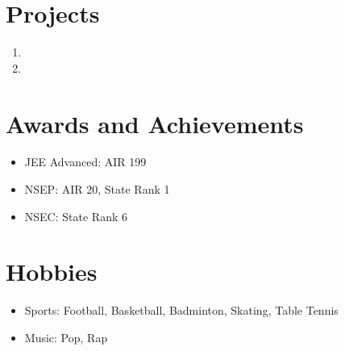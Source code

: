 \documentclass{article}
\begin{document}
\section*{\fontsize{11}{15}\selectfont Projects}
    \begin{enumerate}
        \item
        \lipsum[2]
        \item
        \lipsum[2]
    \end{enumerate}

\section*{\fontsize{11}{15}\selectfont Awards and Achievements}
    \small
    \begin{itemize}
        \renewcommand\labelitemi{--}
        \item
        JEE Advanced: AIR 199
        \item
        NSEP: AIR 20, State Rank 1
        \item
        NSEC: State Rank 6
    \end{itemize}
 

\section*{\fontsize{11}{15}\selectfont Hobbies}
    \small
    \begin{itemize}
        \renewcommand\labelitemi{--}
        \item
        Sports: Football, Basketball, Badminton, Skating, Table Tennis
        \item
        Music: Pop, Rap
    \end{itemize}
\end{document}
